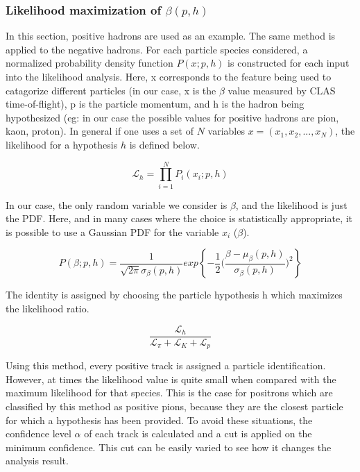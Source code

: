 
\subsubsection*{Likelihood maximization of $\beta(p,h)$}
In this section, positive hadrons are used as an example.  The same method is applied to the negative hadrons.  For each particle species considered, a normalized probability density function $P(x;p,h)$ is constructed for each input into the likelihood analysis.  Here, x corresponds to the feature being used to catagorize different particles (in our case, x is the $\beta$ value measured by CLAS time-of-flight), p is the particle momentum, and h is the hadron being hypothesized (eg: in our case the possible values for positive hadrons are pion, kaon, proton).  In general if one uses a set of $N$ variables $x = (x_1, x_2, ..., x_N)$, the likelihood for a hypothesis $h$ is defined below.

\begin{equation}
  \mathcal{L}_h = \prod^{N}_{i=1} P_{i} (x_i; p, h)
\end{equation}

In our case, the only random variable we consider is $\beta$, and the likelihood is just the PDF.  Here, and in many cases where the choice is statistically appropriate, it is possible to use a Gaussian PDF for the variable $x_i$ ($\beta$).

\begin{equation}
  P(\beta;p,h) = \frac{1}{\sqrt{2 \pi} \sigma_\beta(p,h) } exp \left \{ -\frac{1}{2} \bigg( \frac{\beta - \mu_\beta(p,h)}{\sigma_\beta(p,h)} \bigg)^2 \right \}
\end{equation}

The identity is assigned by choosing the particle hypothesis h which maximizes the likelihood ratio.  
 
\begin{equation}
  \frac{\mathcal{L}_h}{\mathcal{L}_{\pi}+\mathcal{L}_{K}+\mathcal{L}_{p}}
\end{equation}

Using this method, every positive track is assigned a particle identification.  However, at times the likelihood value is quite small when compared with the maximum likelihood for that species.  This is the case for positrons which are classified by this method as positive pions, because they are the closest particle for which a hypothesis has been provided.  To avoid these situations, the confidence level $\alpha$ of each track is calculated and a cut is applied on the minimum confidence.  This cut can be easily varied to see how it changes the analysis result.

